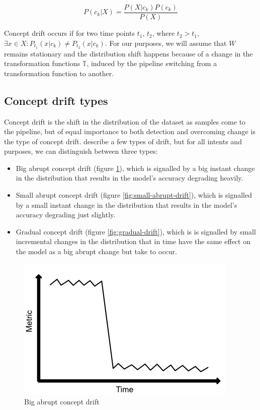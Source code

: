 \documentclass[12pt]{extreport}
\begin{document}
\begin{equation}
    P(c_k|X) = \frac{P(X|c_k) P(c_k)}{P(X)}
\end{equation}

Concept drift occurs if for two time points $t_1$, $t_2$, where $t_2 > t_1$, $\exists x \in X: P_{t_1}(x|c_k) \neq P_{t_2}(x|c_k)$. For our purposes, we will assume that $W$ remains stationary and the distribution shift happens because of a change in the transformation functions $\mathbb{T}$, induced by the pipeline switching from a transformation function to another.

\subsection{Concept drift types}

Concept drift is the shift in the distribution of the dataset as samples come to the pipeline, but of equal importance to both detection and overcoming change is the type of concept drift. \cite{survey-concept-drift} describe a few types of drift, but for all intents and purposes, we can distinguish between three types:

\begin{itemize}
    \item Big abrupt concept drift (figure \ref{fig:big-abrupt-drift}), which is signalled by a big instant change in the distribution that results in the model's accuracy degrading heavily.
    \item Small abrupt concept drift (figure \ref{fig:small-abrupt-drift}), which is signalled by a small instant change in the distribution that results in the model's accuracy degrading just slightly.
    \item Gradual concept drift (figure \ref{fig:gradual-drift}), which is is signalled by small incremental changes in the distribution that in time have the same effect on the model as a big abrupt change but take to occur.
\end{itemize}

\begin{figure}[!ht]
\centering
\includegraphics[width=0.6\linewidth]{assets/preliminaries/big-abrupt-drift.png}
\caption{Big abrupt concept drift}
\label{fig:big-abrupt-drift}
\end{figure}
\end{document}
